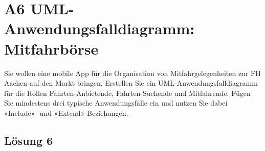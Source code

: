 \documentclass[main.tex]{subfiles}
\begin{document}
\section{A6 UML-Anwendungsfalldiagramm: Mitfahrbörse}
Sie wollen eine mobile App für die Organisation von Mitfahrgelegenheiten zur FH Aachen auf den Markt bringen. Erstellen Sie ein UML-Anwendungsfalldiagramm für die Rollen Fahrten-Anbietende, Fahrten-Suchende und Mitfahrende. Fügen Sie mindestens drei typische Anwendungsfälle ein und nutzen Sie dabei «Include»- und «Extend»-Beziehungen.

\subsection{Lösung 6}
\end{document}
